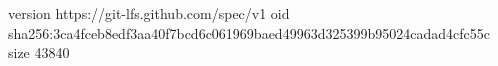 version https://git-lfs.github.com/spec/v1
oid sha256:3ca4fceb8edf3aa40f7bcd6c061969baed49963d325399b95024cadad4cfc55c
size 43840
